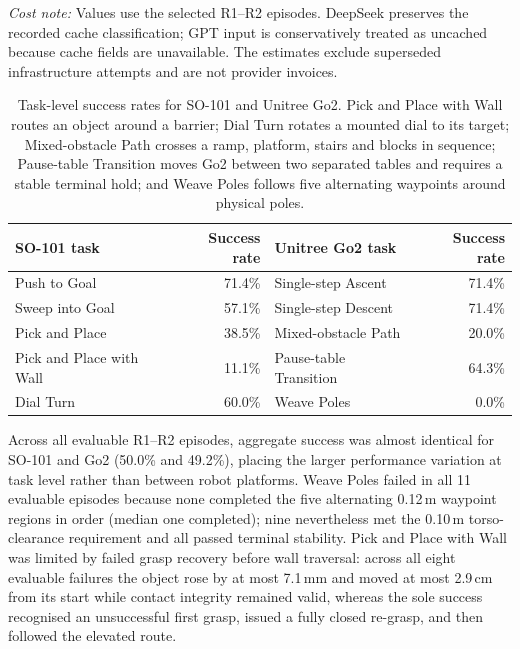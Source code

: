 \noindent\emph{Cost note:} Values use the selected R1--R2 episodes. DeepSeek
preserves the recorded cache classification; GPT input is conservatively
treated as uncached because cache fields are unavailable. The estimates
exclude superseded infrastructure attempts and are not provider invoices.

\begin{table}[htbp]
  \centering
  \small
  \renewcommand{\arraystretch}{1.12}
  \caption{Task-level success rates for SO-101 and Unitree Go2. Pick and Place with Wall routes an object around a barrier; Dial Turn rotates a mounted dial to its target; Mixed-obstacle Path crosses a ramp, platform, stairs and blocks in sequence; Pause-table Transition moves Go2 between two separated tables and requires a stable terminal hold; and Weave Poles follows five alternating waypoints around physical poles.}
  \label{tab:chapter3-exp2b-task-results}
  \begin{tabularx}{\textwidth}{@{}X r X r@{}}
    \toprule
    \textbf{SO-101 task} & \textbf{Success rate} &
    \textbf{Unitree Go2 task} & \textbf{Success rate} \\
    \midrule
    Push to Goal             & 71.4\% &
    Single-step Ascent       & 71.4\% \\
    Sweep into Goal          & 57.1\% &
    Single-step Descent      & 71.4\% \\
    Pick and Place           & 38.5\% &
    Mixed-obstacle Path      & 20.0\% \\
    Pick and Place with Wall & 11.1\% &
    Pause-table Transition   & 64.3\% \\
    Dial Turn                & 60.0\% &
    Weave Poles              & 0.0\% \\
    \bottomrule
  \end{tabularx}
\end{table}

Across all evaluable R1--R2 episodes, aggregate success was almost identical for SO-101 and Go2 (50.0\% and 49.2\%), placing the larger performance variation at task level rather than between robot platforms. Weave Poles failed in all 11 evaluable episodes because none completed the five alternating 0.12\,m waypoint regions in order (median one completed); nine nevertheless met the 0.10\,m torso-clearance requirement and all passed terminal stability. Pick and Place with Wall was limited by failed grasp recovery before wall traversal: across all eight evaluable failures the object rose by at most 7.1\,mm and moved at most 2.9\,cm from its start while contact integrity remained valid, whereas the sole success recognised an unsuccessful first grasp, issued a fully closed re-grasp, and then followed the elevated route.

